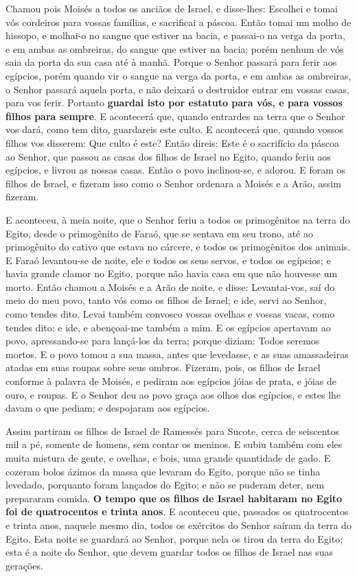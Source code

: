 Chamou pois Moisés a todos os anciãos de Israel, e disse-lhes:
Escolhei e tomai vós cordeiros para vossas famílias, e sacrificai a
páscoa. Então tomai um molho de hissopo, e molhai-o no sangue
que estiver na bacia, e passai-o na verga da porta, e em ambas as
ombreiras, do sangue que estiver na bacia; porém nenhum de vós saia
da porta da sua casa até à manhã. Porque o Senhor passará
para ferir aos egípcios, porém quando vir o sangue na verga da
porta, e em ambas as ombreiras, o Senhor passará aquela porta, e não
deixará o destruidor entrar em vossas casas, para vos ferir.
Portanto \textbf{guardai isto por estatuto para vós, e para
vossos filhos para sempre}. E acontecerá que, quando
entrardes na terra que o Senhor vos dará, como tem dito, guardareis
este culto. E acontecerá que, quando vossos filhos vos
disserem: Que culto é este? Então direis: Este é o sacrifício
da páscoa ao Senhor, que passou as casas dos filhos de Israel no
Egito, quando feriu aos egípcios, e livrou as nossas casas. Então o
povo inclinou-se, e adorou. E foram os filhos de Israel, e
fizeram isso como o Senhor ordenara a Moisés e a Arão, assim
fizeram.

E aconteceu, à meia noite, que o Senhor feriu a todos os
primogênitos na terra do Egito, desde o primogênito de Faraó, que se
sentava em seu trono, até ao primogênito do cativo que estava no
cárcere, e todos os primogênitos dos animais. E Faraó
levantou-se de noite, ele e todos os seus servos, e todos os
egípcios; e havia grande clamor no Egito, porque não havia casa em
que não houvesse um morto. Então chamou a Moisés e a Arão de
noite, e disse: Levantai-vos, saí do meio do meu povo, tanto vós
como os filhos de Israel; e ide, servi ao Senhor, como tendes dito.
Levai também convosco vossas ovelhas e vossas vacas, como
tendes dito; e ide, e abençoai-me também a mim. E os egípcios
apertavam ao povo, apressando-se para lançá-los da terra; porque
diziam: Todos seremos mortos. E o povo tomou a sua massa,
antes que levedasse, e as suas amassadeiras atadas em suas roupas
sobre seus ombros. Fizeram, pois, os filhos de Israel
conforme à palavra de Moisés, e pediram aos egípcios jóias de prata,
e jóias de ouro, e roupas. E o Senhor deu ao povo graça aos
olhos dos egípcios, e estes lhe davam o que pediam; e despojaram aos
egípcios.

Assim partiram os filhos de Israel de Ramessés para Sucote, cerca
de seiscentos mil a pé, somente de homens, sem contar os meninos.
E subiu também com eles muita mistura de gente, e ovelhas, e
bois, uma grande quantidade de gado. E cozeram bolos ázimos
da massa que levaram do Egito, porque não se tinha levedado,
porquanto foram lançados do Egito; e não se puderam deter, nem
prepararam comida. \textbf{O tempo que os filhos de Israel
habitaram no Egito foi de quatrocentos e trinta anos}. E
aconteceu que, passados os quatrocentos e trinta anos, naquele mesmo
dia, todos os exércitos do Senhor saíram da terra do Egito.
Esta noite se guardará ao Senhor, porque nela os tirou da
terra do Egito; esta é a noite do Senhor, que devem guardar todos os
filhos de Israel nas suas gerações.

